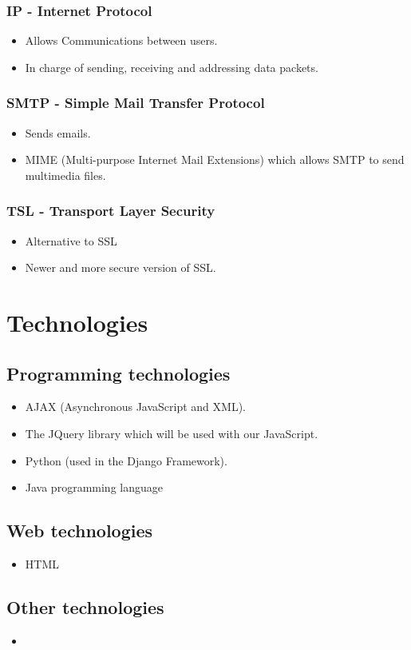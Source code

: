 \documentclass[12pt, oneside]{article}
\begin{document}
		\subsubsection{IP - Internet Protocol}	
			\begin{itemize}
				\item Allows Communications between users.
				\item In charge of sending, receiving and addressing data packets.
			\end{itemize}				
		\subsubsection{SMTP - Simple Mail Transfer Protocol}
			\begin{itemize}
				\item Sends emails.
				\item MIME (Multi-purpose Internet Mail Extensions) which allows SMTP to send multimedia files.
			\end{itemize}
		\subsubsection{TSL - Transport Layer Security}
			\begin{itemize}
				\item Alternative to SSL
				\item Newer and more secure version of SSL.
			\end{itemize}
		
\section{Technologies}
	\subsection{Programming technologies}
		\begin{itemize}
			\item AJAX (Asynchronous JavaScript and XML).
			\item The JQuery library which will be used with our JavaScript.
			\item Python (used in the Django Framework).
			\item Java programming language 
		\end{itemize}
	\subsection{Web technologies}
		\begin{itemize}
			\item HTML
		\end{itemize}
	\subsection{Other technologies}
		\begin{itemize}
			\item
		\end{itemize}
\end{document}
